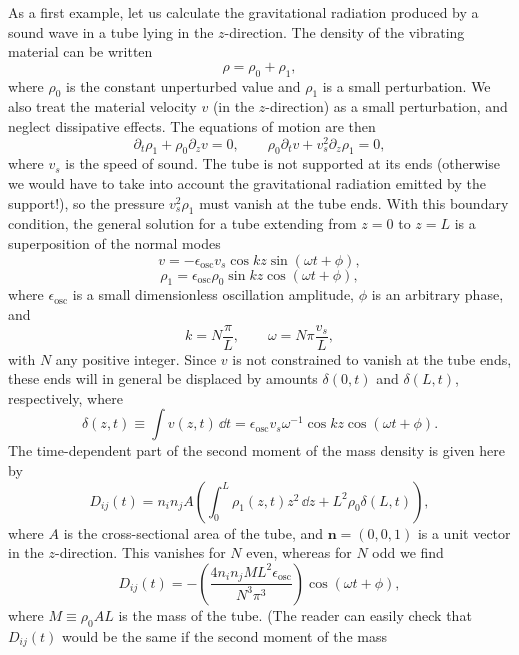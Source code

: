 As a first example, let us calculate the gravitational radiation produced by
a sound wave in a tube lying in the \(z\)-direction. The density of the
vibrating material can be written
\[
  \rho=\rho_0+\rho_1,
\]
where \(\rho_0\) is the constant unperturbed value and \(\rho_1\) is a
small perturbation. We also treat the material velocity \(v\) (in the
\(z\)-direction) as a small perturbation, and neglect dissipative effects.
The equations of motion are then
\[
  \partial_t\rho_1+\rho_0\partial_zv=0,
  \qquad
  \rho_0\partial_tv+v_s^2\partial_z\rho_1=0,
\]
where \(v_s\) is the speed of sound. The tube is not supported at its ends
(otherwise we would have to take into account the gravitational radiation
emitted by the support!), so the pressure \(v_s^2\rho_1\) must vanish at the
tube ends. With this boundary condition, the general solution for a tube
extending from \(z=0\) to \(z=L\) is a superposition of the normal modes
\begin{equation}
  v=-\epsilon_{\mathrm{osc}} v_s\cos kz\sin(\omega t+\phi),
  \tag{10.5.13}\label{eq:10.5.13}
\end{equation}
\begin{equation}
  \rho_1=\epsilon_{\mathrm{osc}}\rho_0\sin kz\cos(\omega t+\phi),
  \tag{10.5.14}\label{eq:10.5.14}
\end{equation}
where \(\epsilon_{\mathrm{osc}}\) is a small dimensionless oscillation amplitude,
\(\phi\) is an arbitrary
phase, and
\begin{equation}
  k=N\frac{\pi}{L},
  \qquad
  \omega=N\pi\frac{v_s}{L},
  \tag{10.5.15}\label{eq:10.5.15}
\end{equation}
with \(N\) any positive integer. Since \(v\) is not constrained to vanish at
the tube ends, these ends will in general be displaced by amounts
\(\delta(0,t)\) and \(\delta(L,t)\), respectively, where
\[
  \delta(z,t)
  \equiv
  \int v(z,t)\,\dd t
  =
  \epsilon_{\mathrm{osc}}v_s\omega^{-1}\cos kz\cos(\omega t+\phi).
\]
The time-dependent part of the second moment of the mass density is given
here by
\[
  D_{ij}(t)
  =
  n_in_jA
  \left(
    \int_0^L\rho_1(z,t)z^2\,\dd z
    +L^2\rho_0\delta(L,t)
  \right),
\]
where \(A\) is the cross-sectional area of the tube, and
\(\mathbf{n}=(0,0,1)\) is a unit vector in the \(z\)-direction. This
vanishes for \(N\) even, whereas for \(N\) odd we find
\[
  D_{ij}(t)
  =
  -\left(
    \frac{4n_in_jML^2\epsilon_{\mathrm{osc}}}{N^3\pi^3}
  \right)\cos(\omega t+\phi),
\]
where \(M\equiv\rho_0AL\) is the mass of the tube. (The reader can easily
check that \(D_{ij}(t)\) would be the same if the second moment of the mass
